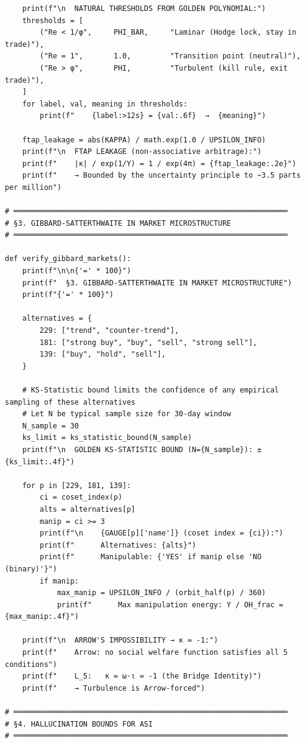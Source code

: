 \begin{verbatim}
    print(f"\n  NATURAL THRESHOLDS FROM GOLDEN POLYNOMIAL:")
    thresholds = [
        ("Re < 1/φ",     PHI_BAR,     "Laminar (Hodge lock, stay in trade)"),
        ("Re = 1",       1.0,         "Transition point (neutral)"),
        ("Re > φ",       PHI,         "Turbulent (kill rule, exit trade)"),
    ]
    for label, val, meaning in thresholds:
        print(f"    {label:>12s} = {val:.6f}  →  {meaning}")

    ftap_leakage = abs(KAPPA) / math.exp(1.0 / UPSILON_INFO)
    print(f"\n  FTAP LEAKAGE (non-associative arbitrage):")
    print(f"    |κ| / exp(1/Υ) = 1 / exp(4π) = {ftap_leakage:.2e}")
    print(f"    → Bounded by the uncertainty principle to ~3.5 parts per million")

# ═══════════════════════════════════════════════════════════════
# §3. GIBBARD-SATTERTHWAITE IN MARKET MICROSTRUCTURE
# ═══════════════════════════════════════════════════════════════

def verify_gibbard_markets():
    print(f"\n\n{'=' * 100}")
    print(f"  §3. GIBBARD-SATTERTHWAITE IN MARKET MICROSTRUCTURE")
    print(f"{'=' * 100}")

    alternatives = {
        229: ["trend", "counter-trend"],
        181: ["strong buy", "buy", "sell", "strong sell"],
        139: ["buy", "hold", "sell"],
    }

    # KS-Statistic bound limits the confidence of any empirical sampling of these alternatives
    # Let N be typical sample size for 30-day window
    N_sample = 30
    ks_limit = ks_statistic_bound(N_sample)
    print(f"\n  GOLDEN KS-STATISTIC BOUND (N={N_sample}): ±{ks_limit:.4f}")

    for p in [229, 181, 139]:
        ci = coset_index(p)
        alts = alternatives[p]
        manip = ci >= 3
        print(f"\n    {GAUGE[p]['name']} (coset index = {ci}):")
        print(f"      Alternatives: {alts}")
        print(f"      Manipulable: {'YES' if manip else 'NO (binary)'}")
        if manip:
            max_manip = UPSILON_INFO / (orbit_half(p) / 360)
            print(f"      Max manipulation energy: Υ / OH_frac = {max_manip:.4f}")

    print(f"\n  ARROW'S IMPOSSIBILITY → κ = -1:")
    print(f"    Arrow: no social welfare function satisfies all 5 conditions")
    print(f"    L_5:   κ = ω·ι = -1 (the Bridge Identity)")
    print(f"    → Turbulence is Arrow-forced")

# ═══════════════════════════════════════════════════════════════
# §4. HALLUCINATION BOUNDS FOR ASI
# ═══════════════════════════════════════════════════════════════


\end{verbatim}
